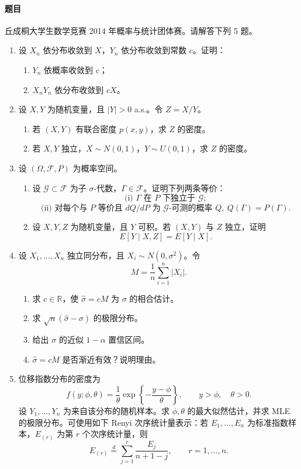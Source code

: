 \documentclass[UTF8,12pt]{ctexart}
\begin{document}
\paragraph{题目}
丘成桐大学生数学竞赛 2014 年概率与统计团体赛。请解答下列 5 题。
\begin{enumerate}[label=\textbf{\arabic*.},leftmargin=2.2em]
\item 设 \(X_n\) 依分布收敛到 \(X\)，\(Y_n\) 依分布收敛到常数 \(c\)。证明：
\begin{enumerate}[label=\textbf{(\alph*)},leftmargin=2.4em]
\item \(Y_n\) 依概率收敛到 \(c\)；
\item \(X_nY_n\) 依分布收敛到 \(cX\)。
\end{enumerate}

\item 设 \(X,Y\) 为随机变量，且 \(|Y|>0\) a.s.。令 \(Z=X/Y\)。
\begin{enumerate}[label=\textbf{(\alph*)},leftmargin=2.4em]
\item 若 \((X,Y)\) 有联合密度 \(p(x,y)\)，求 \(Z\) 的密度。
\item 若 \(X,Y\) 独立，\(X\sim N(0,1)\)，\(Y\sim U(0,1)\)，求 \(Z\) 的密度。
\end{enumerate}

\item 设 \((\Omega,\mathcal F,P)\) 为概率空间。
\begin{enumerate}[label=\textbf{(\alph*)},leftmargin=2.4em]
\item 设 \(\mathcal G\subset\mathcal F\) 为子 \(\sigma\)-代数，\(\Gamma\in\mathcal F\)。证明下列两条等价：
\[
\text{(i) }\Gamma\text{ 在 }P\text{ 下独立于 }\mathcal G;
\]
\[
\text{(ii) 对每个与 }P\text{ 等价且 }dQ/dP\text{ 为 }\mathcal G\text{-可测的概率 }Q,\ Q(\Gamma)=P(\Gamma).
\]
\item 设 \(X,Y,Z\) 为随机变量，且 \(Y\) 可积。若 \((X,Y)\) 与 \(Z\) 独立，证明
\[
E[Y\mid X,Z]=E[Y\mid X].
\]
\end{enumerate}

\item 设 \(X_1,\ldots,X_n\) 独立同分布，且 \(X_i\sim N(0,\sigma^2)\)。令
\[
M=\frac1n\sum_{i=1}^n |X_i|.
\]
\begin{enumerate}[label=\textbf{(\arabic*)},leftmargin=2.4em]
\item 求 \(c\in\mathbb R\)，使 \(\widehat\sigma=cM\) 为 \(\sigma\) 的相合估计。
\item 求 \(\sqrt n(\widehat\sigma-\sigma)\) 的极限分布。
\item 给出 \(\sigma\) 的近似 \(1-\alpha\) 置信区间。
\item \(\widehat\sigma=cM\) 是否渐近有效？说明理由。
\end{enumerate}

\item 位移指数分布的密度为
\[
f(y;\phi,\theta)=\frac1\theta \exp\left\{-\frac{y-\phi}{\theta}\right\},
\qquad y>\phi,\quad \theta>0.
\]
设 \(Y_1,\ldots,Y_n\) 为来自该分布的随机样本。求 \(\phi,\theta\) 的最大似然估计，并求 MLE 的极限分布。可使用如下 Renyi 次序统计量表示：若 \(E_1,\ldots,E_n\) 为标准指数样本，\(E_{(r)}\) 为第 \(r\) 个次序统计量，则
\[
E_{(r)}\stackrel d=\sum_{j=1}^r\frac{E_j}{n+1-j},\qquad r=1,\ldots,n.
\]
\end{enumerate}
\end{document}
